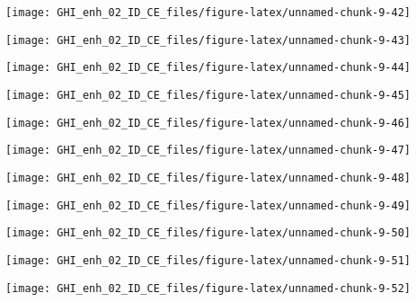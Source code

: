 \documentclass[
  10pt,
  a4paper,oneside]{article}
\begin{document}
\begin{center}\texttt{[image: GHI\_enh\_02\_ID\_CE\_files/figure-latex/unnamed-chunk-9-42]} \end{center}

\begin{center}\texttt{[image: GHI\_enh\_02\_ID\_CE\_files/figure-latex/unnamed-chunk-9-43]} \end{center}

\begin{center}\texttt{[image: GHI\_enh\_02\_ID\_CE\_files/figure-latex/unnamed-chunk-9-44]} \end{center}

\begin{center}\texttt{[image: GHI\_enh\_02\_ID\_CE\_files/figure-latex/unnamed-chunk-9-45]} \end{center}

\begin{center}\texttt{[image: GHI\_enh\_02\_ID\_CE\_files/figure-latex/unnamed-chunk-9-46]} \end{center}

\begin{center}\texttt{[image: GHI\_enh\_02\_ID\_CE\_files/figure-latex/unnamed-chunk-9-47]} \end{center}

\begin{center}\texttt{[image: GHI\_enh\_02\_ID\_CE\_files/figure-latex/unnamed-chunk-9-48]} \end{center}

\begin{center}\texttt{[image: GHI\_enh\_02\_ID\_CE\_files/figure-latex/unnamed-chunk-9-49]} \end{center}

\begin{center}\texttt{[image: GHI\_enh\_02\_ID\_CE\_files/figure-latex/unnamed-chunk-9-50]} \end{center}

\begin{center}\texttt{[image: GHI\_enh\_02\_ID\_CE\_files/figure-latex/unnamed-chunk-9-51]} \end{center}

\begin{center}\texttt{[image: GHI\_enh\_02\_ID\_CE\_files/figure-latex/unnamed-chunk-9-52]} \end{center}
\end{document}
